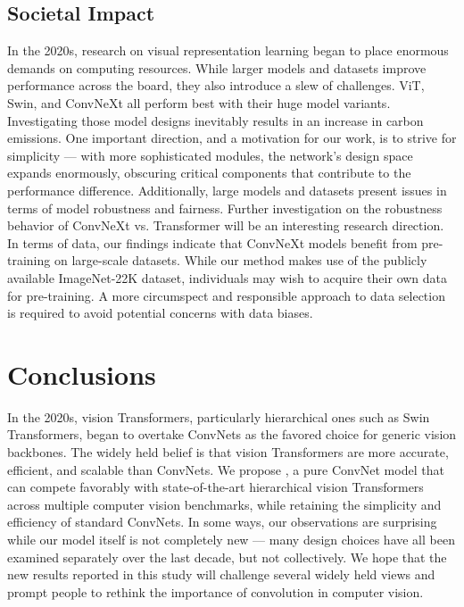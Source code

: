 \subsection{Societal Impact}
\label{sec:impact}
In the 2020s, research on visual representation learning began to place enormous demands on computing resources. While larger models and datasets improve performance across the board, they also introduce a slew of challenges. ViT, Swin, and ConvNeXt all perform best with their huge model variants. Investigating those model designs inevitably results in an increase in carbon emissions. One important direction, and a motivation for our work, is to strive for simplicity --- with more sophisticated modules, the network's design space expands enormously, obscuring critical components that contribute to the performance difference. Additionally, large models and datasets present issues in terms of model robustness and fairness. 
Further investigation on the robustness behavior of ConvNeXt vs. Transformer will be an interesting research direction. In terms of data, our findings indicate that ConvNeXt models benefit from pre-training on large-scale datasets. While our method makes use of the publicly available ImageNet-22K dataset, individuals may wish to acquire their own data for pre-training. A more circumspect and responsible approach to data selection is required to avoid potential concerns with data biases.

\section{Conclusions}
In the 2020s, vision Transformers, particularly hierarchical ones such as Swin Transformers, began to overtake ConvNets as the favored choice for generic vision backbones. The widely held belief is that vision Transformers are more accurate, efficient, and scalable than ConvNets. We propose , a pure ConvNet model that can compete favorably with state-of-the-art hierarchical vision Transformers across multiple computer vision benchmarks, while retaining the simplicity and efficiency of standard ConvNets. In some ways, our observations are surprising while our \cnn{} model itself is not completely new --- many design choices have all been examined separately over the last decade, but not collectively. We hope that the new results reported in this study will challenge several widely held views and prompt people to rethink the importance of convolution in computer vision.






